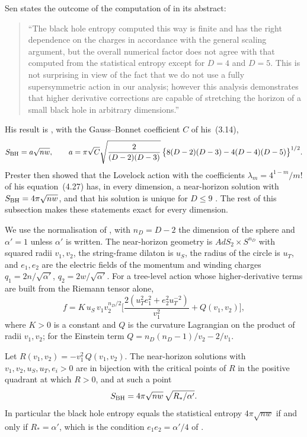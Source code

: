 Sen states the outcome of the computation of \cite{Sen05stretching} in its abstract:
\begin{quote}\small
``The black hole entropy computed this way is finite and has the right dependence on the charges in accordance with the general scaling argument, but the overall numerical factor does not agree with that computed from the statistical entropy except for $D=4$ and $D=5$. This is not surprising in view of the fact that we do not use a fully supersymmetric action in our analysis; however this analysis demonstrates that higher derivative corrections are capable of stretching the horizon of a small black hole in arbitrary dimensions.''
\end{quote}
His result is \cite[Eq.~(3.20)]{Sen05stretching}, with the Gauss--Bonnet coefficient $C$ of his~(3.14),
\begin{equation}\label{eq:sen320}
S_{\rm BH}=a\sqrt{nw},\qquad a=\pi\sqrt C\sqrt{\frac{2}{(D-2)(D-3)}}\,\big\{8(D-2)(D-3)-4(D-4)(D-5)\big\}^{1/2}.
\end{equation}
Prester \cite{Prester06} then showed that the Lovelock action with the coefficients $\lambda_m=4^{1-m}/m!$ of his equation~(4.27) has, in every dimension, a near-horizon solution with $S_{\rm BH}=4\pi\sqrt{nw}$, and that his solution is unique for $D\le9$ \cite[footnote~9]{Prester06}. The rest of this subsection makes these statements exact for every dimension.

 We use the normalisation of \cite[Eq.~(4.3)]{Prester06}, with $n_D=D-2$ the dimension of the sphere and $\alpha'=1$ unless $\alpha'$ is written. The near-horizon geometry is $AdS_2\times S^{n_D}$ with squared radii $v_1,v_2$, the string-frame dilaton is $u_S$, the radius of the circle is $u_T$, and $e_1,e_2$ are the electric fields of the momentum and winding charges $q_1=2n/\sqrt{\alpha'}$, $q_2=2w/\sqrt{\alpha'}$. For a tree-level action whose higher-derivative terms are built from the Riemann tensor alone,
\begin{equation}\label{eq:fgeneral}
f=K\,u_S\,v_1v_2^{n_D/2}\Big[\frac{2(u_T^2e_1^2+e_2^2u_T^{-2})}{v_1^2}+Q(v_1,v_2)\Big],
\end{equation}
where $K>0$ is a constant and $Q$ is the curvature Lagrangian on the product of radii $v_1,v_2$; for the Einstein term $Q=n_D(n_D-1)/v_2-2/v_1$.

\begin{theorem}\label{thm:twocharge}
Let $R(v_1,v_2)=-v_1^2\,Q(v_1,v_2)$. The near-horizon solutions with $v_1,v_2,u_S,u_T,e_i>0$ are in bijection with the critical points of $R$ in the positive quadrant at which $R>0$, and at such a point
\begin{equation}\label{eq:sR}
S_{\rm BH}=4\pi\sqrt{nw}\,\sqrt{R_*/\alpha'}.
\end{equation}
In particular the black hole entropy equals the statistical entropy $4\pi\sqrt{nw}$ if and only if $R_*=\alpha'$, which is the condition $e_1e_2=\alpha'/4$ of \cite[Eq.~(5.6)]{Prester06}.
\end{theorem}

